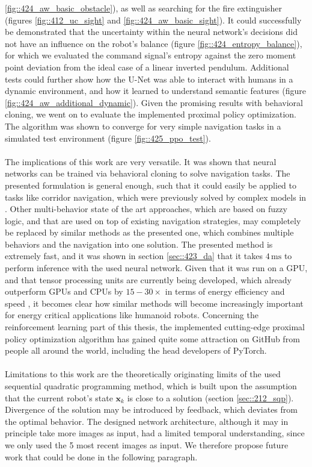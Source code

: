 \ref{fig::424_aw_basic_obstacle}), as well as searching for the fire extinguisher (figures \ref{fig::412_uc_sight} and \ref{fig::424_aw_basic_sight}). It could successfully be demonstrated that the uncertainty within the neural network's decisions did not have an influence on the robot's balance (figure \ref{fig::424_entropy_balance}), for which we evaluated the command signal's entropy against the zero moment point deviation from the ideal case of a linear inverted pendulum. Additional tests could further show how the U-Net was able to interact with humans in a dynamic environment, and how it learned to understand semantic features (figure \ref{fig::424_aw_additional_dynamic}). Given the promising results with behavioral cloning, we went on to evaluate the implemented proximal policy optimization. The algorithm was shown to converge for very simple navigation tasks in a simulated test environment (figure \ref{fig::425_ppo_test}).
\\\\
The implications of this work are very versatile. It was shown that neural networks can be trained via behavioral cloning to solve navigation tasks. The presented formulation is general enough, such that it could easily be applied to tasks like corridor navigation, which were previously solved by complex models in \cite{faragasso2013vision}. Other multi-behavior state of the art approaches, which are based on fuzzy logic, and that are used on top of existing navigation strategies, may completely be replaced by similar methods as the presented one, which combines multiple behaviors and the navigation into one solution. The presented method is extremely fast, and it was shown in section \ref{sec::423_da} that it takes $4\,\text{ms}$ to perform inference with the used neural network. Given that it was run on a GPU, and that tensor processing units are currently being developed, which already outperform GPUs and CPUs by $15-30\times$ in terms of energy efficiency and speed \cite{jouppi2017datacenter}, it becomes clear how similar methods will become increasingly important for energy critical applications like humanoid robots. Concerning the reinforcement learning part of this thesis, the implemented cutting-edge proximal policy optimization algorithm has gained quite some attraction on GitHub from people all around the world, including the head developers of PyTorch.
\\\\
Limitations to this work are the theoretically originating limits of the used sequential quadratic programming method, which is built upon the assumption that the current robot's state $\bm{x}_k$ is close to a solution (section \ref{sec::212_sqp}). Divergence of the solution may be introduced by feedback, which deviates from the optimal behavior. The designed network architecture, although it may in principle take more images as input, had a limited temporal understanding, since we only used the 5 most recent images as input. We therefore propose future work that could be done in the following paragraph.
